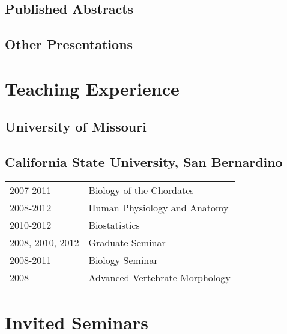 \documentclass[10pt,letterpaper,]{article}
\begin{document}
\hypertarget{published-abstracts}{%
\subsection{Published Abstracts}\label{published-abstracts}}

\hypertarget{other-presentations}{%
\subsection{Other Presentations}\label{other-presentations}}

\hypertarget{teaching-experience}{%
\section{Teaching Experience}\label{teaching-experience}}

\hypertarget{university-of-missouri}{%
\subsection{University of Missouri}\label{university-of-missouri}}


\hypertarget{california-state-university-san-bernardino}{%
\subsection{California State University, San
Bernardino}\label{california-state-university-san-bernardino}}

\begin{tabular}{ll}
  2007-2011 & Biology of the Chordates \\ 
  2008-2012 & Human Physiology and Anatomy \\ 
  2010-2012 & Biostatistics \\ 
  2008, 2010, 2012 & Graduate Seminar \\ 
  2008-2011 & Biology Seminar \\ 
  2008 & Advanced Vertebrate Morphology \\ 
  \end{tabular}

\hypertarget{invited-seminars}{%
\section{Invited Seminars}\label{invited-seminars}}
\end{document}
